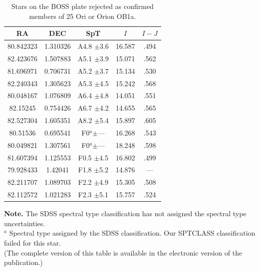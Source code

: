 \documentclass[12pt]{article}
\begin{document}
\begin{table} \scriptsize
\begin{center}
 \caption[Stars on the BOSS plate rejected as confirmed members of 25 Ori or Orion OB1a]{Stars on the BOSS plate rejected as confirmed members of 25 Ori or Orion OB1a.}
 \label{tab_BOSS:field_stars}
 \begin{threeparttable}
  	\setlength{\tabcolsep}{20pt}
	\begin{tabular}{ccccc}
	\toprule
	{\bf RA} & {\bf DEC} & {\bf SpT} & $I$ & $I-J$ \\
	\midrule
	80.842323 & 1.310326 & A4.8  $\pm$3.6   & 16.587 & .494  \\
	82.423676 & 1.507883 & A5.1  $\pm$3.9   & 15.071 & .562  \\
	81.696971 & 0.706731 & A5.2  $\pm$3.7   & 15.134 & .530  \\
	82.240343 & 1.305623 & A5.3  $\pm$4.5   & 15.242 & .568  \\
	80.048167 & 1.076809 & A6.4  $\pm$4.8   & 14.051 & .551  \\
	82.15245  & 0.754426 & A6.7  $\pm$4.2   & 14.655 & .565  \\
	82.527304 & 1.605351 & A8.2  $\pm$5.4   & 15.897 & .605  \\
	80.51536  & 0.695541 & F0$^a$$\pm$---   & 16.268 & .543  \\
	80.049821 & 1.307561 & F0$^a$$\pm$---   & 18.248 & .598  \\
	81.607394 & 1.125553 & F0.5  $\pm$4.5   & 16.802 & .499  \\
	79.928433 & 1.42041  & F1.8  $\pm$5.2   & 14.876 & ---   \\
	82.211707 & 1.089703 & F2.2  $\pm$4.9   & 15.305 & .508  \\
	82.112572 & 1.021283 & F2.3  $\pm$5.1   & 15.757 & .524  \\
	\bottomrule
	\end{tabular}
	\begin{tablenotes}
	  {\bf Note.} The SDSS spectral type classification has not assigned the spectral type uncertainties.\\
	  $^a$ Spectral type assigned by the SDSS classification. Our SPTCLASS classification failed for this star.\\
	  (The complete version of this table is available in the electronic version of the \citealt{Suarez2017} publication.)\\
	\end{tablenotes}
 \end{threeparttable}
\end{center}
\end{table}
\end{document}

